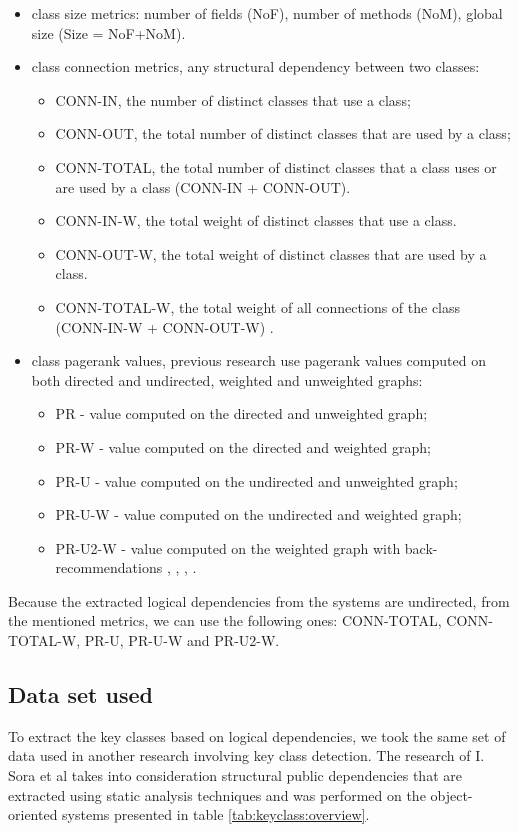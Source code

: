\documentclass[12pt]{mitthesis}
\begin{document}
\begin{itemize}
	\item class size metrics: number of fields (NoF),  number of methods (NoM), global size (Size = NoF+NoM).
	\item class connection metrics, any structural dependency between two classes:
		\begin{itemize}
			\item CONN-IN, the number of distinct classes that use a class;
			\item CONN-OUT, the total number of distinct classes that are used by a class;
			\item CONN-TOTAL, the total number of distinct classes that a class uses or are used by a class (CONN-IN + CONN-OUT).
			\item CONN-IN-W, the total weight of distinct classes that use a class. 
			\item CONN-OUT-W, the total weight of distinct classes that are used by a class. 
			\item CONN-TOTAL-W, the total weight of all connections of the class (CONN-IN-W + CONN-OUT-W) \cite{Finding-key-classes}.
		\end{itemize}
	\item class pagerank values, previous research use pagerank values computed on both directed and undirected, weighted and unweighted graphs:
		\begin{itemize}
			\item PR - value computed on the directed and unweighted graph;
			\item PR-W - value computed on the directed and weighted graph;
			\item PR-U - value computed on the undirected and unweighted graph;
			\item PR-U-W - value computed on the undirected and weighted graph;
			\item PR-U2-W - value computed on the weighted graph with back-recommendations \cite{PagerankENASE}, \cite{enase15}, \cite{Finding-key-classes}, \cite{PagerankSACI}.
		\end{itemize}
\end{itemize}

Because the extracted logical dependencies from the systems are undirected, from the mentioned metrics, we can use the following ones:  CONN-TOTAL, CONN-TOTAL-W, PR-U, PR-U-W and PR-U2-W.



\subsection{Data set used}
\label{sec:dataset}
To extract the key classes based on logical dependencies, we took the same set of data used in another research involving key class detection. The research of I. Sora et al \cite{Finding-key-classes} takes into consideration structural public dependencies that are extracted using static analysis techniques and was performed on the object-oriented systems presented in table \ref{tab:keyclass:overview}.
\end{document}
